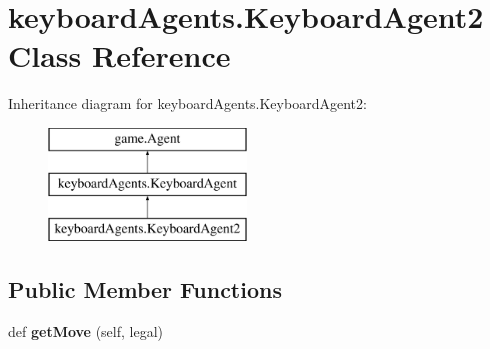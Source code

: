 \hypertarget{classkeyboard_agents_1_1_keyboard_agent2}{}\section{keyboard\+Agents.\+Keyboard\+Agent2 Class Reference}
\label{classkeyboard_agents_1_1_keyboard_agent2}
Inheritance diagram for keyboard\+Agents.\+Keyboard\+Agent2\+:\begin{figure}[H]
\begin{center}
\leavevmode
\includegraphics[height=3.000000cm]{classkeyboard_agents_1_1_keyboard_agent2}
\end{center}
\end{figure}
\subsection*{Public Member Functions}
\begin{DoxyCompactItemize}
\item 
\mbox{\label{classkeyboard_agents_1_1_keyboard_agent2_a31d5f7e4cb4b593d397d749542e2f506}} 
def {\bfseries get\+Move} (self, legal)
\end{DoxyCompactItemize}
